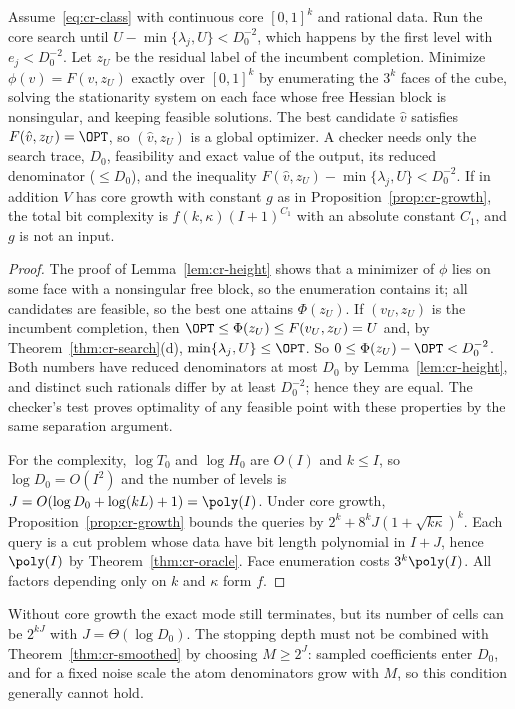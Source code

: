 \begin{theorem}\label{thm:cr-exact}
Assume~\eqref{eq:cr-class} with continuous core $[0,1]^k$ and rational data.
Run the core search until $U-\min\{\lambda_j,U\}<D_0^{-2}$, which happens
by the first level with $e_j<D_0^{-2}$. Let $z_U$ be the residual label
of the incumbent completion. Minimize $\phi(v)=F(v,z_U)$ exactly over
$[0,1]^k$ by enumerating the $3^k$ faces of the cube, solving the
stationarity system on each face whose free Hessian block is nonsingular,
and keeping feasible solutions. The best candidate $\hat v$ satisfies
$F(\hat v,z_U)=\OPT$, so $(\hat v,z_U)$ is a global optimizer. A checker
needs only the search trace, $D_0$, feasibility and exact value of the
output, its reduced denominator ($\le D_0$), and the inequality
$F(\hat v,z_U)-\min\{\lambda_j,U\}<D_0^{-2}$.
If in addition $V$ has core growth with constant $g$ as in
Proposition~\ref{prop:cr-growth}, the total bit complexity is
$f(k,\kappa)(I+1)^{C_1}$ with an absolute constant $C_1$, and $g$ is not
an input.
\end{theorem}
\begin{proof}
The proof of Lemma~\ref{lem:cr-height} shows that a minimizer of $\phi$
lies on some face with a nonsingular free block, so the enumeration
contains it; all candidates are feasible, so the best one attains
$\Phi(z_U)$. If $(v_U,z_U)$ is the incumbent completion, then
$\OPT\le\Phi(z_U)\le F(v_U,z_U)=U$ and, by Theorem~\ref{thm:cr-search}(d),
$\min\{\lambda_j,U\}\le\OPT$. So $0\le\Phi(z_U)-\OPT<D_0^{-2}$. Both
numbers have reduced denominators at most $D_0$ by
Lemma~\ref{lem:cr-height}, and distinct such rationals differ by at least
$D_0^{-2}$; hence they are equal. The checker's test proves optimality of
any feasible point with these properties by the same separation argument.

For the complexity, $\log T_0$ and $\log H_0$ are $O(I)$ and $k\le I$, so
$\log D_0=O(I^2)$ and the number of levels is
$J=O(\log D_0+\log(kL)+1)=\poly(I)$. Under core growth,
Proposition~\ref{prop:cr-growth} bounds the queries by
$2^k+8^kJ(1+\sqrt{k\kappa})^k$. Each query is a cut problem whose data have
bit length polynomial in $I+J$, hence $\poly(I)$ by
Theorem~\ref{thm:cr-oracle}. Face enumeration costs $3^k\poly(I)$. All
factors depending only on $k$ and $\kappa$ form $f$.
\end{proof}

Without core growth the exact mode still terminates, but its number of
cells can be $2^{kJ}$ with $J=\Theta(\log D_0)$. The stopping depth must
not be combined with Theorem~\ref{thm:cr-smoothed} by choosing
$M\ge2^{J}$: sampled coefficients enter $D_0$, and for a fixed noise scale
the atom denominators grow with $M$, so this condition generally cannot
hold.

